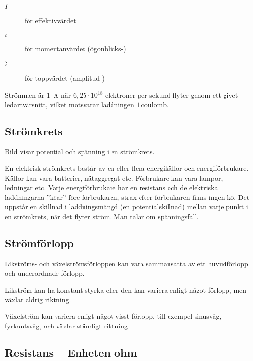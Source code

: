 \begin{description}
\item[\(I\)] för effektivvärdet
\item[\(i\)] för momentanvärdet (ögonblicks-)
\item[\(\hat{i}\)] för toppvärdet (amplitud-)
\end{description}

Strömmen är \qty{1}{\ampere} när \(6,25 \cdot 10^{18}\) elektroner per sekund
flyter genom ett givet ledartvärsnitt, vilket motsvarar laddningen
\(1\ \mathrm{coulomb}\).

\subsection{Strömkrets}
\label{strömkrets}


Bild  visar potential och spänning i en strömkrets.

En elektrisk strömkrets består av en eller flera energikällor och
energiförbrukare.
Källor kan vara batterier, nätaggregat etc.
Förbrukare kan vara lampor, ledningar etc.
Varje energiförbrukare har en resistans och de elektriska laddningarna ''köar''
före förbrukaren, strax efter förbrukaren finns ingen kö.
Det uppstår en skillnad i laddningsmängd (en potentialskillnad) mellan varje
punkt i en strömkrets, när det flyter ström.
Man talar om spänningsfall.

\subsection{Strömförlopp}

Likströms- och växelströmsförloppen kan vara sammansatta av ett huvudförlopp och
underordnade förlopp.

Likström kan ha konstant styrka eller den kan variera enligt något förlopp, men
växlar aldrig riktning.

Växelström kan variera enligt något visst förlopp, till exempel sinusvåg,
fyrkantsvåg, och växlar ständigt riktning.

\subsection{Resistans -- Enheten ohm}
\label{resistans}

